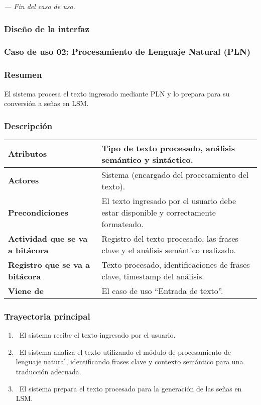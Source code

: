 \textit{--- Fin del caso de uso.}

\subsubsection{Diseño de la interfaz}

\subsubsection{Caso de uso 02: Procesamiento de Lenguaje Natural (PLN)}
\subsubsection{Resumen}
El sistema procesa el texto ingresado mediante PLN y lo prepara para su conversión a señas en LSM.
\subsubsection{Descripción}
\begin{table}[h]
    \centering
    \begin{longtable}{|l|p{10cm}|}  %
    \hline
    \textbf{Atributos} & Tipo de texto procesado, análisis semántico y sintáctico. \\ \hline
    \textbf{Actores} & Sistema (encargado del procesamiento del texto). \\ \hline
    \textbf{Precondiciones} & El texto ingresado por el usuario debe estar disponible y correctamente formateado. \\ \hline
    \textbf{Actividad que se va a bitácora} & Registro del texto procesado, las frases clave y el análisis semántico realizado. \\ \hline
    \textbf{Registro que se va a bitácora} & Texto procesado, identificaciones de frases clave, timestamp del análisis. \\ \hline
    \textbf{Viene de} & El caso de uso “Entrada de texto”. \\ \hline
      
    \end{longtable}
\end{table}
    
\subsubsection{Trayectoria principal}
\begin{enumerate}[label=\textbf{\arabic*}, leftmargin=1.5cm]
    \item \UCsystem \ El sistema recibe el texto ingresado por el usuario.
    
    \item \UCsystem \ El sistema analiza el texto utilizando el módulo de procesamiento de lenguaje natural, identificando frases clave y contexto semántico para una traducción adecuada.
    
    \item \UCsystem \ El sistema prepara el texto procesado para la generación de las señas en LSM.

\end{enumerate}

